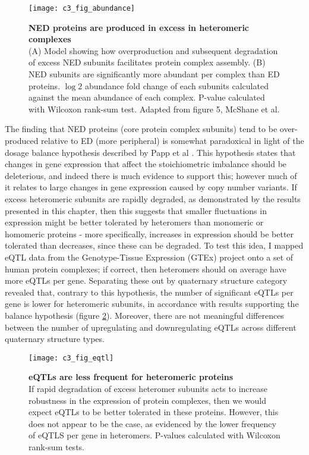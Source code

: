 \documentclass[a4paper,11pt,twoside,openright]{scrbook}
\begin{document}
\begin{figure}[h]
\fcapsideright
    {\caption[NED proteins are produced in excess in heteromeric complexes]{\sffamily\textbf{NED proteins are produced in excess in heteromeric complexes} \\ \small (A) Model showing how overproduction and subsequent degradation of excess NED subunits facilitates protein complex assembly. (B) NED subunits are significantly more abundant per complex than ED proteins. $\log{2}$ abundance fold change of each subunits calculated against the mean abundance of each complex. P-value calculated with Wilcoxon rank-sum test. Adapted from figure 5, McShane et al. \cite{McShane2016}}\label{figure:nedabundance}}
    {\texttt{[image: c3\_fig\_abundance]}}
\end{figure}

The finding that NED proteins (core protein complex subunits) tend to be over-produced relative to ED (more peripheral) is somewhat paradoxical in light of the dosage balance hypothesis described by Papp et al \cite{Papp2003}. This hypothesis states that changes in gene expression that affect the stoichiometric imbalance should be deleterious, and indeed there is much evidence to support this; however much of it relates to large changes in gene expression caused by copy number variants. If excess heteromeric subunits are rapidly degraded, as demonstrated by the results presented in this chapter, then this suggests that smaller fluctuations in expression might be better tolerated by heteromers than monomeric or homomeric proteins - more specifically, increases in expression should be better tolerated than decreases, since these can be degraded. To test this idea, I mapped eQTL data from the Genotype-Tissue Expression \cite{Brown2016} (GTEx) project onto a set of human protein complexes; if correct, then heteromers should on average have more eQTLs per gene. Separating these out by quaternary structure category revealed that, contrary to this hypothesis, the number of significant eQTLs per gene is lower for heteromeric subunits, in accordance with results supporting the balance hypothesis (figure \ref{figure:eqtls}). Moreover, there are not meaningful differences between the number of upregulating and downregulating eQTLs across different quaternary structure types.

\begin{figure}[h]
\fcapsideright
    {\caption[eQTLs are less frequent for heteromeric proteins]{\sffamily\textbf{eQTLs are less frequent for heteromeric proteins} \\ \small If rapid degradation of excess heteromer subunits acts to increase robustness in the expression of protein complexes, then we would expect eQTLs to be better tolerated in these proteins. However, this does not appear to be the case, as evidenced by the lower frequency of eQTLS per gene in heteromers. P-values calculated with Wilcoxon rank-sum tests.}\label{figure:eqtls}}
    {\texttt{[image: c3\_fig\_eqtl]}}
\end{figure}
\end{document}
